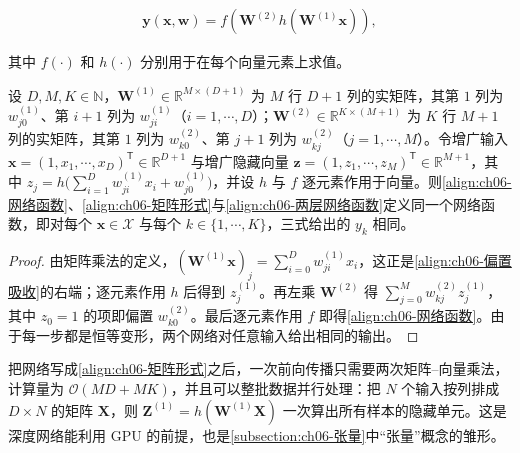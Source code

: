 \documentclass[../../main.tex]{subfiles}
\begin{document}
\begin{align}
\boldsymbol{y}(\boldsymbol{x},\boldsymbol{w})=f\!\left(\boldsymbol{W}^{(2)}h\!\left(\boldsymbol{W}^{(1)}\boldsymbol{x}\right)\right),
\label{align:ch06-矩阵形式}
\end{align}

其中 $f(\cdot)$ 和 $h(\cdot)$ 分别用于在每个向量元素上求值。

\begin{proposition}[偏置吸收的等价性]\label{proposition:ch06-偏置吸收}
设 $D,M,K\in\mathbb{N}$，$\boldsymbol{W}^{(1)}\in\mathbb{R}^{M\times(D+1)}$ 为 $M$ 行 $D+1$ 列的实矩阵，其第 $1$ 列为 $w_{j0}^{(1)}$、第 $i+1$ 列为 $w_{ji}^{(1)}$（$i=1,\cdots,D$）；$\boldsymbol{W}^{(2)}\in\mathbb{R}^{K\times(M+1)}$ 为 $K$ 行 $M+1$ 列的实矩阵，其第 $1$ 列为 $w_{k0}^{(2)}$、第 $j+1$ 列为 $w_{kj}^{(2)}$（$j=1,\cdots,M$）。令增广输入 $\boldsymbol{x}=(1,x_{1},\cdots,x_{D})^{\mathsf T}\in\mathbb{R}^{D+1}$ 与增广隐藏向量 $\boldsymbol{z}=(1,z_{1},\cdots,z_{M})^{\mathsf T}\in\mathbb{R}^{M+1}$，其中 $z_{j}=h\bigl(\sum_{i=1}^{D}w_{ji}^{(1)}x_{i}+w_{j0}^{(1)}\bigr)$，并设 $h$ 与 $f$ 逐元素作用于向量。则\eqref{align:ch06-网络函数}、\eqref{align:ch06-矩阵形式}与\eqref{align:ch06-两层网络函数}定义同一个网络函数，即对每个 $\boldsymbol{x}\in\mathcal{X}$ 与每个 $k\in\{1,\cdots,K\}$，三式给出的 $y_{k}$ 相同。
\end{proposition}

\begin{proof}
由矩阵乘法的定义，$\left(\boldsymbol{W}^{(1)}\boldsymbol{x}\right)_j=\sum_{i=0}^{D}w_{ji}^{(1)}x_i$，这正是\eqref{align:ch06-偏置吸收}的右端；逐元素作用 $h$ 后得到 $z_j^{(1)}$。再左乘 $\boldsymbol{W}^{(2)}$ 得 $\sum_{j=0}^{M}w_{kj}^{(2)}z_j^{(1)}$，其中 $z_0=1$ 的项即偏置 $w_{k0}^{(2)}$。最后逐元素作用 $f$ 即得\eqref{align:ch06-网络函数}。由于每一步都是恒等变形，两个网络对任意输入给出相同的输出。
\end{proof}

\begin{remark}把网络写成\eqref{align:ch06-矩阵形式}之后，一次前向传播只需要两次矩阵--向量乘法，计算量为 $\mathcal{O}(MD+MK)$，并且可以整批数据并行处理：把 $N$ 个输入按列排成 $D\times N$ 的矩阵 $\boldsymbol{X}$，则 $\boldsymbol{Z}^{(1)}=h(\boldsymbol{W}^{(1)}\boldsymbol{X})$ 一次算出所有样本的隐藏单元。这是深度网络能利用 GPU 的前提，也是\cref{subsection:ch06-张量}中“张量”概念的雏形。
\end{remark}
\end{document}
